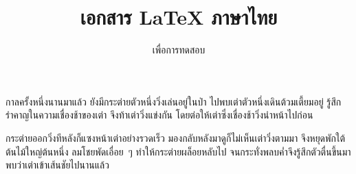 \documentclass[a4paper]{article}
\title{เอกสาร \LaTeX{} ภาษาไทย}
\author{เพื่อการทดสอบ}
\date{}
\begin{document}
\maketitle

กาลครั้งหนึ่งนานมาแล้ว ยังมีกระต่ายตัวหนึ่งวิ่งเล่นอยู่ในป่า ไปพบเต่าตัวหนึ่งเดินต้วมเตี้ยมอยู่
รู้สึกรำคาญในความเชื่องช้าของเต่า จึงท้าเต่าวิ่งแข่งกัน โดยต่อให้เต่าซึ่งเชื่องช้าวิ่งนำหน้าไปก่อน

กระต่ายออกวิ่งทีหลังก็แซงหน้าเต่าอย่างรวดเร็ว มองกลับหลังมาดูก็ไม่เห็นเต่าวิ่งตามมา
จึงหยุดพักใต้ต้นไม้ใหญ่ต้นหนึ่ง ลมโชยพัดเอื่อย~ๆ ทำให้กระต่ายผล็อยหลับไป
จนกระทั่งพลบค่ำจึงรู้สึกตัวตื่นขึ้นมาพบว่าเต่าเข้าเส้นชัยไปนานแล้ว
\end{document}
